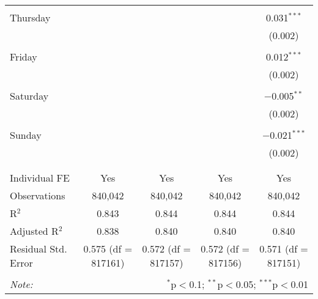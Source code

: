 \documentclass[
]{article}
\begin{document}
\begin{table}[!htbp]
{\begin{tabular}{@{\extracolsep{5pt}}lcccc}
  & & & & \\ 
 Thursday &  &  &  & 0.031$^{***}$ \\ 
  &  &  &  & (0.002) \\ 
  & & & & \\ 
 Friday &  &  &  & 0.012$^{***}$ \\ 
  &  &  &  & (0.002) \\ 
  & & & & \\ 
 Saturday &  &  &  & $-$0.005$^{**}$ \\ 
  &  &  &  & (0.002) \\ 
  & & & & \\ 
 Sunday &  &  &  & $-$0.021$^{***}$ \\ 
  &  &  &  & (0.002) \\ 
  & & & & \\ 
\hline \\[-1.8ex] 
Individual FE & Yes & Yes & Yes & Yes \\ 
Observations & 840,042 & 840,042 & 840,042 & 840,042 \\ 
R$^{2}$ & 0.843 & 0.844 & 0.844 & 0.844 \\ 
Adjusted R$^{2}$ & 0.838 & 0.840 & 0.840 & 0.840 \\ 
Residual Std. Error & 0.575 (df = 817161) & 0.572 (df = 817157) & 0.572 (df = 817156) & 0.571 (df = 817151) \\ 
\hline 
\hline \\[-1.8ex] 
\textit{Note:}  & \multicolumn{4}{r}{$^{*}$p$<$0.1; $^{**}$p$<$0.05; $^{***}$p$<$0.01} \\ 
\end{tabular}
} 
\end{table} 
\newpage
\end{document}

